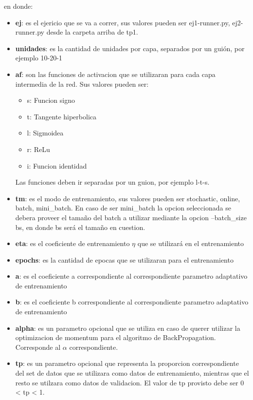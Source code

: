 en donde:
\begin{itemize}
  \item \textbf{ej}: es el ejericio que se va a correr, sus valores pueden ser {ej1-runner.py, ej2-runner.py} desde la carpeta arriba de tp1.
  \item \textbf{unidades}: es la cantidad de unidades por capa, separados por un guión, por ejemplo 10-20-1
  \item \textbf{af}: son las funciones de activacion que se utilizaran para cada capa intermedia de la red. Sus valores pueden ser:
	  \begin{itemize} 
	      \item s: Funcion signo
	      \item t: Tangente hiperbolica
          \item l: Sigmoidea
          \item r: ReLu
          \item i: Funcion identidad
       \end{itemize}
	   Las funciones deben ir separadas por un guion, por ejemplo l-t-s.
  \item \textbf{tm}: es el modo de entrenamiento, sus valores pueden ser {stochastic, online, batch, mini\_batch}. En caso de ser mini\_batch la opcion seleccionada se debera
            proveer el tamaño del batch a utilizar mediante la opcion --batch\_size bs, en donde bs será el tamaño en cuestion.
  \item \textbf{eta}: es el coeficiente de entrenamiento $\eta$ que se utilizará en el entrenamiento
  \item \textbf{epochs}: es la cantidad de epocas que se utilizaran para el entrenamiento
  \item \textbf{a}: es el coeficiente a correspondiente al correspondiente parametro adaptativo de entrenamiento
  \item \textbf{b}: es el coeficiente b correspondiente al correspondiente parametro adaptativo de entrenamiento
  \item \textbf{alpha}: es un parametro opcional que se utiliza en caso de querer utilizar la optimizacion de momentum para el algoritmo de BackPropagation. Corresponde al $\alpha$
                correspondiente.
  \item \textbf{tp}: es un parametro opcional que representa la proporcion correspondiente del set de datos que se utilizara como datos de entrenamiento,
            mientras que el resto se utilzara como datos de validacion. El valor de tp provisto debe ser 0 < tp < 1.

\end{itemize}
